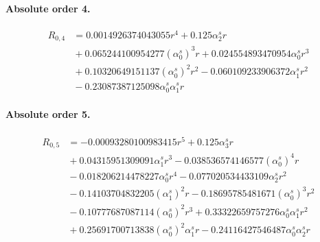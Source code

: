 \documentclass[10pt]{article}
\begin{document}
\paragraph{Absolute order 4.}
\begin{align*}
R_{0,4} &= 0.0014926374043055 r^{4} + 0.125 \alpha_{2}^s r \\
&{}  + 0.065244100954277 \left(\alpha_{0}^s\right)^{3} r + 0.024554893470954 \alpha_{0}^s r^{3} \\
&{}  + 0.10320649151137 \left(\alpha_{0}^s\right)^{2} r^{2} - 0.060109233906372 \alpha_{1}^s r^{2} \\
&{}  - 0.23087387125098 \alpha_{0}^s \alpha_{1}^s r
\end{align*}

\paragraph{Absolute order 5.}
\begin{align*}
R_{0,5} &=  - 0.00093280100983415 r^{5} + 0.125 \alpha_{3}^s r \\
&{}  + 0.04315951309091 \alpha_{1}^s r^{3} - 0.038536574146577 \left(\alpha_{0}^s\right)^{4} r \\
&{}  - 0.018206214478227 \alpha_{0}^s r^{4} - 0.077020534433109 \alpha_{2}^s r^{2} \\
&{}  - 0.14103704832205 \left(\alpha_{1}^s\right)^{2} r - 0.18695785481671 \left(\alpha_{0}^s\right)^{3} r^{2} \\
&{}  - 0.10777687087114 \left(\alpha_{0}^s\right)^{2} r^{3} + 0.33322659757276 \alpha_{0}^s \alpha_{1}^s r^{2} \\
&{}  + 0.25691700713838 \left(\alpha_{0}^s\right)^{2} \alpha_{1}^s r - 0.24116427546487 \alpha_{0}^s \alpha_{2}^s r
\end{align*}
\end{document}
